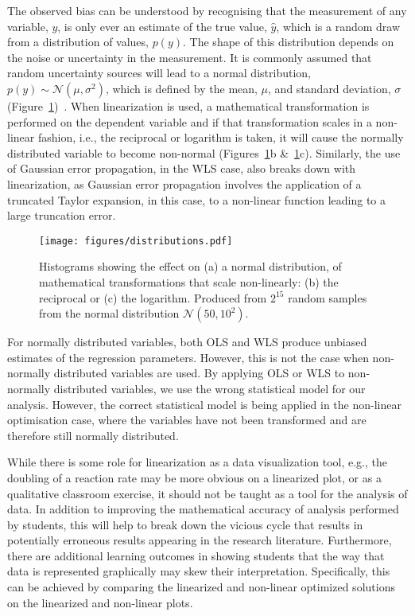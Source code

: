 \documentclass[journal=jceda8,manuscript=article]{achemso}
\begin{document}
The observed bias can be understood by recognising that the measurement of any variable, $y$, is only ever an estimate of the true value, $\hat{y}$, which is a random draw from a distribution of values, $p(y)$. 
The shape of this distribution depends on the noise or uncertainty in the measurement. 
It is commonly assumed that random uncertainty sources will lead to a normal distribution, $p(y) \sim \mathcal{N}(\mu, \sigma^2)$, which is defined by the mean, $\mu$, and standard deviation, $\sigma$ (Figure~\ref{fig:distributions})~\cite{monk_math_2010}.
When linearization is used, a mathematical transformation is performed on the dependent variable and if that transformation scales in a non-linear fashion, i.e., the reciprocal or logarithm is taken, it will cause the normally distributed variable to become non-normal (Figures~\ref{fig:distributions}b \&~\ref{fig:distributions}c).
Similarly, the use of Gaussian error propagation, in the WLS case, also breaks down with linearization, as Gaussian error propagation involves the application of a truncated Taylor expansion, in this case, to a non-linear function leading to a large truncation error.
%
\begin{figure}
  \texttt{[image: figures/distributions.pdf]}
  \caption{  
    Histograms showing the effect on (a) a normal distribution, of mathematical transformations that scale non-linearly: (b) the reciprocal or (c) the logarithm. 
    Produced from $2^{15}$ random samples from the normal distribution $\mathcal{N}(50, 10^2)$.
    }
  \label{fig:distributions}
\end{figure}
%

For normally distributed variables, both OLS and WLS produce unbiased estimates of the regression parameters. 
However, this is not the case when non-normally distributed variables are used. 
By applying OLS or WLS to non-normally distributed variables, we use the wrong statistical model for our analysis. 
However, the correct statistical model is being applied in the non-linear optimisation case, where the variables have not been transformed and are therefore still normally distributed. 

While there is some role for linearization as a data visualization tool, e.g., the doubling of a reaction rate may be more obvious on a linearized plot, or as a qualitative classroom exercise, it should not be taught as a tool for the analysis of data. 
In addition to improving the mathematical accuracy of analysis performed by students, this will help to break down the vicious cycle that results in potentially erroneous results appearing in the research literature.
Furthermore, there are additional learning outcomes in showing students that the way that data is represented graphically may skew their interpretation.
Specifically, this can be achieved by comparing the linearized and non-linear optimized solutions on the linearized and non-linear plots. 
\end{document}
